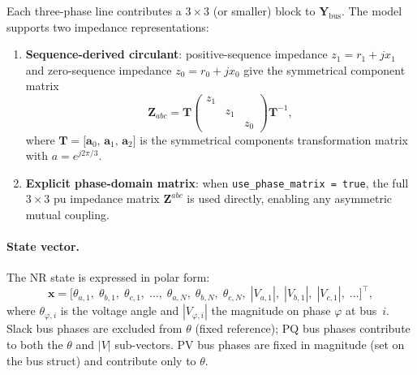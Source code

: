Each three-phase line contributes a $3\times 3$ (or smaller) block to
$\mathbf{Y}_{\text{bus}}$.  The model supports two impedance representations:
\begin{enumerate}
  \item \textbf{Sequence-derived circulant}: positive-sequence impedance
    $z_1 = r_1 + jx_1$ and zero-sequence impedance $z_0 = r_0 + jx_0$
    give the symmetrical component matrix
    \[
      \mathbf{Z}_{abc} = \mathbf{T}
      \begin{pmatrix} z_1 & & \\ & z_1 & \\ & & z_0 \end{pmatrix}
      \mathbf{T}^{-1},
    \]
    where $\mathbf{T} = \bigl[\mathbf{a}_0,\, \mathbf{a}_1,\, \mathbf{a}_2\bigr]$
    is the symmetrical components transformation matrix with
    $a = e^{j2\pi/3}$.
  \item \textbf{Explicit phase-domain matrix}: when
    \texttt{use\_phase\_matrix = true}, the full $3\times 3$ pu impedance
    matrix $\mathbf{Z}^{abc}$ is used directly, enabling any
    asymmetric mutual coupling.
\end{enumerate}

\paragraph{State vector.}
The NR state is expressed in polar form:
\[
  \mathbf{x} =
  \bigl[\theta_{a,1},\; \theta_{b,1},\; \theta_{c,1},\;\ldots,\;
        \theta_{a,N},\; \theta_{b,N},\; \theta_{c,N},\;
        |V_{a,1}|,\; |V_{b,1}|,\; |V_{c,1}|,\;\ldots\bigr]^{\top},
\]
where $\theta_{\varphi,i}$ is the voltage angle and $|V_{\varphi,i}|$
the magnitude on phase $\varphi$ at bus~$i$.  Slack bus phases are
excluded from $\theta$ (fixed reference); PQ bus phases contribute
to both the $\theta$ and $|V|$ sub-vectors.  PV bus phases are fixed
in magnitude (set on the bus struct) and contribute only to $\theta$.

